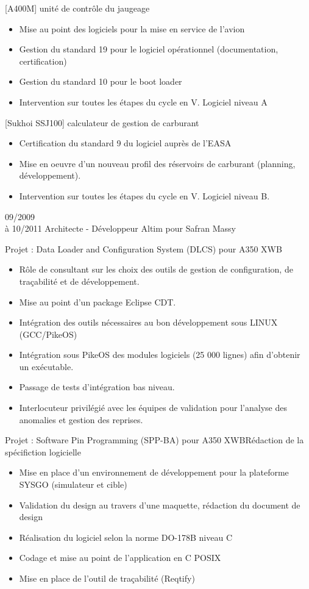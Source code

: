 \documentclass[10pt,a4paper]{moderncv}       %
\begin{document}
{
[A400M] unité de contrôle du jaugeage
\begin{itemize}
\setlength{\itemindent}{2mm}
  \item Mise au point des logiciels pour la mise en service de l’avion
  \item Gestion du standard 19 pour le logiciel opérationnel (documentation, certification)
  \item Gestion du standard 10 pour le boot loader
  \item Intervention sur toutes les étapes du cycle en V. Logiciel niveau A
\end{itemize}
[Sukhoi SSJ100] calculateur de gestion de carburant
\begin{itemize}
\setlength{\itemindent}{2mm}
  \item Certification du standard 9 du logiciel auprès de l’EASA
  \item Mise en oeuvre d’un nouveau profil des réservoirs de carburant (planning, développement).
  \item Intervention sur toutes les étapes du cycle en V. Logiciel niveau B.
\end{itemize}
}
\vspace*{3mm}
\cventry
{09/2009\\à 10/2011}       %
{Architecte - Développeur} %
{Altim pour Safran}        %
{Massy}                    %
{}                         %
{
Projet : Data Loader and Configuration System (DLCS) pour A350 XWB
\begin{itemize}
\setlength{\itemindent}{2mm}
  \item Rôle  de consultant sur les choix des outils de gestion de configuration, de traçabilité et de développement.
  \item Mise au point d’un package Eclipse CDT.
  \item Intégration des outils nécessaires au bon développement sous LINUX (GCC/PikeOS)
  \item Intégration sous PikeOS des modules logiciels (25 000 lignes) afin d'obtenir un exécutable.
  \item Passage de tests d'intégration bas niveau.
  \item Interlocuteur privilégié avec les équipes de validation pour l'analyse des anomalies et gestion des reprises.
\end{itemize}
Projet : Software Pin Programming (SPP-BA) pour A350 XWBRédaction de la
spécifiction logicielle
\begin{itemize}
\setlength{\itemindent}{2mm}
  \item Mise en place d'un environnement de développement pour la plateforme SYSGO (simulateur et cible)
  \item Validation du design au travers d'une maquette, rédaction du document de design
  \item Réalisation du logiciel selon la norme DO-178B niveau C
  \item Codage et mise au point de l’application en C POSIX
  \item Mise en place de l’outil de traçabilité (Reqtify)
\end{itemize}
}
\end{document}
